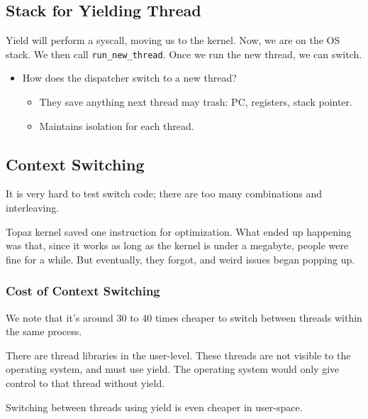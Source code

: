\documentclass[openany]{book}
\begin{document}
\subsection{Stack for Yielding Thread}

Yield will perform a syscall, moving us to the kernel. Now, we are on the OS stack. We then call \texttt{run\_new\_thread}. Once we run the new thread, we can switch.

\begin{itemize}
	\item How does the dispatcher switch to a new thread?
	\begin{itemize}
		\item They save anything next thread may trash: PC, registers, stack pointer.
		\item Maintains isolation for each thread.
	\end{itemize}
\end{itemize}


\subsection{Context Switching}
\begin{rmk}
	It is very hard to test switch code; there are too many combinations and interleaving. 
\end{rmk}

\begin{warn}
	Topaz kernel saved one instruction for optimization. What ended up happening was that, since it works as long as the kernel is under a megabyte, people were fine for a while. But eventually, they forgot, and weird issues began popping up.
\end{warn}

\subsubsection{Cost of Context Switching}
We note that it's around 30 to 40 times cheaper to switch between threads within the same process.

\begin{rmk}
	There are thread libraries in the user-level. These threads are not visible to the operating system, and must use yield. The operating system would only give control to that thread without yield.
	
	Switching between threads using yield is even cheaper in user-space.
\end{rmk}
\end{document}
